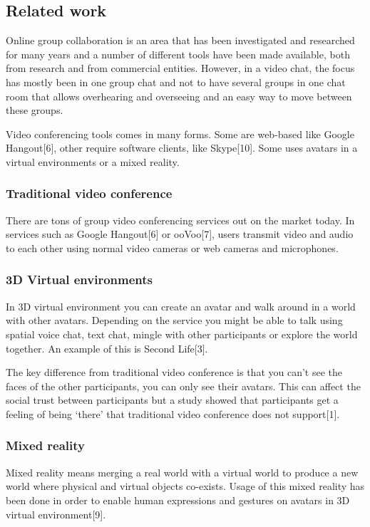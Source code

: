 \documentclass[12pt, titlepage]{article}
\begin{document}
\subsection{Related work}
Online group collaboration is an area that has been investigated and researched for many years and a number of different tools have been made available, both from research and from commercial entities. However, in a video chat, the focus has mostly been in one group chat and not to have several groups in one chat room that allows overhearing and overseeing and an easy way to move between these groups.

Video conferencing tools comes in many forms. Some are web-based like Google Hangout[6], other require software clients, like Skype[10]. Some uses avatars in a virtual environments or a mixed reality.
\subsubsection{Traditional video conference}
There are tons of group video conferencing services out on the market today. In services such as Google Hangout[6] or ooVoo[7], users transmit video and audio to each other using normal video cameras or web cameras and microphones.
\subsubsection{3D Virtual environments}
In 3D virtual environment you can create an avatar and walk around in a world with other avatars. Depending on the service you might be able to talk using spatial voice chat, text chat, mingle with other participants or explore the world together. An example of this is Second Life[3].

The key difference from traditional video conference is that you can’t see the faces of the other participants, you can only see their avatars. This can affect the social trust between participants but a study showed that participants get a feeling of being ‘there’ that traditional video conference does not support[1].
\subsubsection{Mixed reality}
Mixed reality means merging a real world with a virtual world to produce a new world where physical and virtual objects co-exists. Usage of this mixed reality has been done in order to enable human expressions and gestures on avatars in 3D virtual environment[9].
\end{document}
